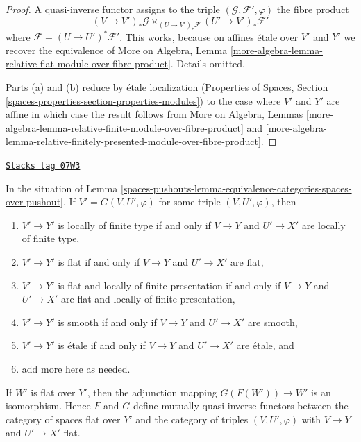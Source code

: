 \begin{proof}
A quasi-inverse functor assigns to the triple
$(\mathcal{G}, \mathcal{F}', \varphi)$ the fibre product
$$
(V \to V')_*\mathcal{G}
\times_{(U \to V')_*\mathcal{F}}
(U' \to V')_*\mathcal{F}'
$$
where $\mathcal{F} = (U \to U')^*\mathcal{F}'$. This works, because on
affines \'etale over $V'$ and $Y'$ we recover the equivalence of
More on Algebra, Lemma
\ref{more-algebra-lemma-relative-flat-module-over-fibre-product}.
Details omitted.

\medskip\noindent
Parts (a) and (b) reduce by \'etale localization
(Properties of Spaces, Section
\ref{spaces-properties-section-properties-modules})
to the case where $V'$ and $Y'$ are affine in which case the result
follows from
More on Algebra, Lemmas
\ref{more-algebra-lemma-relative-finite-module-over-fibre-product} and
\ref{more-algebra-lemma-relative-finitely-presented-module-over-fibre-product}.
\end{proof}


\begin{lemma}
\label{spaces-pushouts-lemma-equivalence-categories-spaces-pushout-flat}
\href{https://stacks.math.columbia.edu/tag/07W3}{\texttt{Stacks tag 07W3}}

In the situation of
Lemma \ref{spaces-pushouts-lemma-equivalence-categories-spaces-over-pushout}.
If $V' = G(V, U', \varphi)$ for some triple $(V, U', \varphi)$, then
\begin{enumerate}
\item $V' \to Y'$ is locally of finite type if and only if $V \to Y$ and
$U' \to X'$ are locally of finite type,
\item $V' \to Y'$ is flat if and only if $V \to Y$ and $U' \to X'$ are flat,
\item $V' \to Y'$ is flat and locally of finite presentation if and only if
$V \to Y$ and $U' \to X'$ are flat and locally of finite presentation,
\item $V' \to Y'$ is smooth if and only if $V \to Y$ and $U' \to X'$ are smooth,
\item $V' \to Y'$ is \'etale if and only if $V \to Y$ and $U' \to X'$
are \'etale, and
\item add more here as needed.
\end{enumerate}
If $W'$ is flat over $Y'$, then the adjunction mapping
$G(F(W')) \to W'$ is an isomorphism. Hence $F$ and $G$ define mutually
quasi-inverse functors between the category of spaces flat over $Y'$
and the category of triples $(V, U', \varphi)$ with $V \to Y$
and $U' \to X'$ flat.
\end{lemma}

